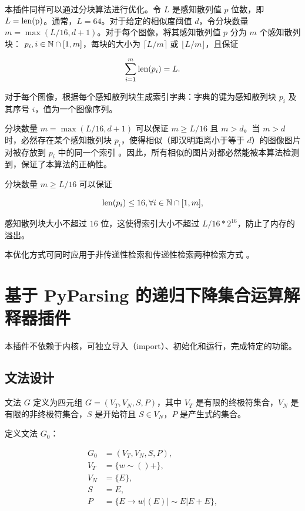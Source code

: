 本插件同样可以通过分块算法进行优化。令 $L$ 是感知散列值 $p$ 位数，即 $L = \rm{len}(p)$。通常，$L = 64$。对于给定的相似度阈值 $d$，令分块数量 $m = \max(L/16, d+1)$。对于每个图像，将其感知散列值 $p$ 分为 $m$ 个感知散列块： $p_i, i \in \mathbb{N} \cap [1, m]$，每块的大小为 $\lceil L/m \rceil$ 或 $\lfloor L/m \rfloor$，且保证

\begin{equation}
\sum_{i=1}^m {\rm len} (p_i) = L.
\end{equation}

对于每个图像，根据每个感知散列块生成索引字典：字典的键为感知散列块 $p_i$ 及其序号 $i$，值为一个图像序列。

分块数量 $m = \max(L/16, d+1)$ 可以保证 $m \geq L/16$ 且 $m > d$。当 $m > d$ 时，必然存在某个感知散列块 $p_i$，使得相似（即汉明距离小于等于 $d$）的图像图片对被存放到 $p_i$ 中的同一个索引 \cite{phash3}。因此，所有相似的图片对都必然能被本算法检测到，保证了本算法的正确性。

分块数量 $m \geq L/16$ 可以保证

\begin{equation}
{\rm len} (p_i) \leq 16, \forall i \in \mathbb{N} \cap [1, m],
\end{equation}

感知散列块大小不超过 $16$ 位，这使得索引大小不超过 $L/16*2^{16}$，防止了内存的溢出。

本优化方式可同时应用于非传递性检索和传递性检索两种检索方式 \cite{phash3}。

\section{基于 PyParsing 的递归下降集合运算解释器插件}

本插件不依赖于内核，可独立导入（import）、初始化和运行，完成特定的功能。

\subsection{文法设计}

文法 $G$ 定义为四元组 $G=(V_T, V_N, S, P)$，其中 $V_T$ 是有限的终极符集合，$V_N$ 是有限的非终极符集合，$S$ 是开始符且 $S \in V_N$，$P$ 是产生式的集合。

定义文法 $G_0$：

\begin{equation}
\begin{aligned}
G_0 &= (V_T, V_N, S, P),\\
V_T &= \{w\sim()+\},\\
V_N &= \{E\},\\
S &= E,\\
P &= \{E \to w | (E) | \sim E | E+E\},
\end{aligned}
\end{equation}

